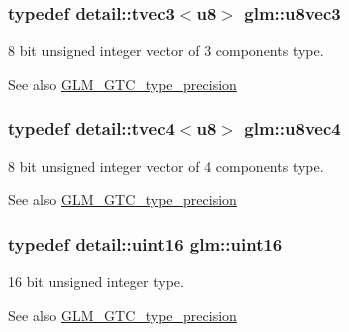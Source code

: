 \subsubsection[{u8vec3}]{\setlength{\rightskip}{0pt plus 5cm}typedef detail\+::tvec3$<$u8$>$ {\bf glm\+::u8vec3}}\label{group__gtc__type__precision_ga4dcca30d49842b1f4c919a0303944099}
8 bit unsigned integer vector of 3 components type. \begin{DoxySeeAlso}{See also}
\hyperlink{group__gtc__type__precision}{G\+L\+M\+\_\+\+G\+T\+C\+\_\+type\+\_\+precision} 
\end{DoxySeeAlso}
\hypertarget{group__gtc__type__precision_ga165acf96e342bac32fe1dbf5bfd8a4e1}{}
\subsubsection[{u8vec4}]{\setlength{\rightskip}{0pt plus 5cm}typedef detail\+::tvec4$<$u8$>$ {\bf glm\+::u8vec4}}\label{group__gtc__type__precision_ga165acf96e342bac32fe1dbf5bfd8a4e1}
8 bit unsigned integer vector of 4 components type. \begin{DoxySeeAlso}{See also}
\hyperlink{group__gtc__type__precision}{G\+L\+M\+\_\+\+G\+T\+C\+\_\+type\+\_\+precision} 
\end{DoxySeeAlso}
\hypertarget{group__gtc__type__precision_gad8c2939e1fdd8e5828b31d95c52255d5}{}
\subsubsection[{uint16}]{\setlength{\rightskip}{0pt plus 5cm}typedef detail\+::uint16 {\bf glm\+::uint16}}\label{group__gtc__type__precision_gad8c2939e1fdd8e5828b31d95c52255d5}
16 bit unsigned integer type. \begin{DoxySeeAlso}{See also}
\hyperlink{group__gtc__type__precision}{G\+L\+M\+\_\+\+G\+T\+C\+\_\+type\+\_\+precision} 
\end{DoxySeeAlso}
\hypertarget{group__gtc__type__precision_gac4eb4f43cae8129b00086dc234d3b8fc}{}

